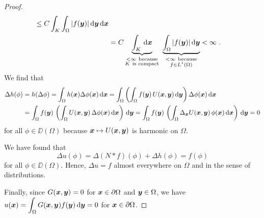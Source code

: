 \begin{proof}
\begin{align*}
\leq C \int_K \int_{\Omega} |f(\VEC{y})| \dx{\VEC{y}} \dx{\VEC{x}} \\
&= C \underbrace{\int_K \dx{\VEC{x}}}_{\substack{<\infty \ \text{because}\\
K \ \text{is compact}}} \ 
\underbrace{\int_{\Omega} |f(\VEC{y})|
\dx{\VEC{y}}}_{\substack{<\infty\ \text{because}\\f \in L^1(\Omega)}}
< \infty \ .
\end{align*}
We find that
\begin{align*}
\Delta h(\phi) &= h(\Delta \phi)
= \int_{\Omega} h({\bm{x}}) \Delta \phi({\bm{x}}) \,\mathrm{d}{{\bm{x}}}
= \int_{\Omega} \left( \int_{\Omega} f({\bm{y}})\, U({\bm{x}},{\bm{y}})
\,\mathrm{d}{{\bm{y}}} \right) \Delta \phi({\bm{x}}) \,\mathrm{d}{{\bm{x}}} \\
&= \int_{\Omega} f({\bm{y}})\, \left( \int_{\Omega} U({\bm{x}},{\bm{y}})
\, \Delta \phi({\bm{x}}) \,\mathrm{d}{{\bm{x}}} \right) \,\mathrm{d}{{\bm{y}}}
= \int_{\Omega} f({\bm{y}}) \, \left( \int_{\Omega} 
\Delta_{{\bm{x}}}U({\bm{x}},{\bm{y}})
\, \phi({\bm{x}}) \,\mathrm{d}{{\bm{x}}} \right) \,\mathrm{d}{{\bm{y}}}
= 0
\end{align*}
for all $\phi \in \DD(\Omega)$ because
${\bm{x}} \mapsto U({\bm{x}},{\bm{y}})$ is harmonic on $\Omega$.

We have found that
\[
 \Delta u(\phi) = \Delta(N \ast f)(\phi) + \Delta h (\phi)
 = f(\phi)
\]
for all $\phi \in \DD(\Omega)$.  Hence, $\Delta u = f$ almost
everywhere on $\Omega$ and in the sense of distributions.

Finally, since
$G({\bm{x}},{\bm{y}})=0$ for ${\bm{x}}\in \partial \Omega$ and
${\bm{y}}\in \Omega$, we have
$\displaystyle u({\bm{x}})
= \int_{\Omega} G({\bm{x}},{\bm{y}})f({\bm{y}}) \,\mathrm{d}{{\bm{y}}} = 0$
for ${\bm{x}} \in \partial \Omega$.
\end{proof}


